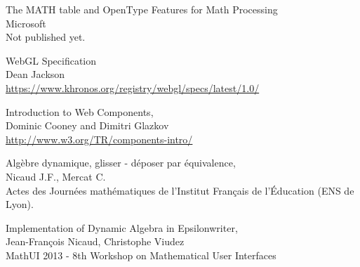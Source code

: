 \begin{thebibliography}{7}
The MATH table and OpenType Features for Math Processing \\
Microsoft \\
Not published yet.

WebGL Specification \\
Dean Jackson \\
\href{https://www.khronos.org/registry/webgl/specs/latest/1.0/}{https://www.khronos.org/registry/webgl/specs/latest/1.0/}

Introduction to Web Components, \\
Dominic Cooney and Dimitri Glazkov \\
\href{http://www.w3.org/TR/components-intro/}{http://www.w3.org/TR/components-intro/}

Algèbre dynamique, glisser - déposer par équivalence, \\
Nicaud J.F., Mercat C. \\
Actes des Journées mathématiques de l'Institut Français de l'Éducation (ENS de Lyon).

Implementation of Dynamic Algebra in Epsilonwriter, \\
Jean-François Nicaud, Christophe Viudez \\
MathUI 2013 - 8th Workshop on Mathematical User Interfaces

\end{thebibliography}
